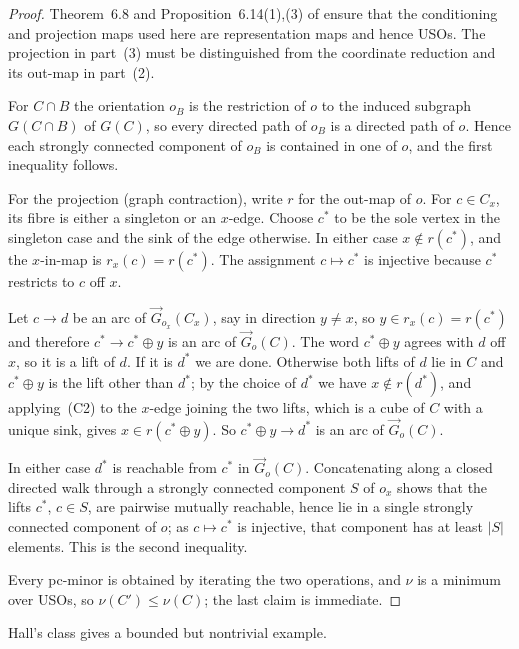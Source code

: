 \documentclass[11pt]{article}
\theoremstyle{definition}
\begin{document}
\begin{proof}
Theorem~6.8 and Proposition~6.14(1),(3) of \cite{CCMW} ensure that the
conditioning and projection maps used here are representation maps and hence
USOs. The projection in part~(3) must be distinguished from the coordinate
reduction and its out-map in part~(2).

For $C\cap B$ the orientation $o_{B}$ is the restriction of $o$ to the induced
subgraph $G(C\cap B)$ of $G(C)$, so every directed path of $o_{B}$ is a directed
path of $o$. Hence each strongly connected component of $o_{B}$ is contained in
one of $o$, and the first inequality follows.

For the projection (graph contraction), write $r$ for the out-map of $o$.
For $c\in C_x$, its fibre is either a singleton or an $x$-edge.
Choose $c^\ast$ to be the sole vertex in the singleton case and the sink
of the edge otherwise. In either case $x\notin r(c^\ast)$, and the
$x$-in-map is $r_x(c)=r(c^\ast)$. The assignment $c\mapsto c^\ast$
is injective because $c^\ast$ restricts to $c$ off $x$.

Let $c\to d$ be an arc of $\overrightarrow{G}_{o_{x}}(C_{x})$, say in direction
$y\ne x$, so $y\in r_{x}(c)=r(c^{\ast})$ and therefore $c^{\ast}\to c^{\ast}
\oplus y$ is an arc of $\overrightarrow{G}_{o}(C)$. The word $c^{\ast}\oplus y$
agrees with $d$ off $x$, so it is a lift of $d$. If it is $d^{\ast}$ we are done.
Otherwise both lifts of $d$ lie in $C$ and $c^{\ast}\oplus y$ is the lift other
than $d^{\ast}$; by the choice of $d^{\ast}$ we have $x\notin r(d^{\ast})$, and
applying~(C2) to the $x$-edge joining the two lifts, which is a cube of $C$ with
a unique sink, gives $x\in r(c^{\ast}\oplus y)$. So $c^{\ast}\oplus y\to
d^{\ast}$ is an arc of $\overrightarrow{G}_{o}(C)$.

In either case $d^{\ast}$ is reachable from $c^{\ast}$ in
$\overrightarrow{G}_{o}(C)$. Concatenating along a closed directed walk through a
strongly connected component $S$ of $o_{x}$ shows that the lifts $c^{\ast}$,
$c\in S$, are pairwise mutually reachable, hence lie in a single strongly
connected component of $o$; as $c\mapsto c^{\ast}$ is injective, that component
has at least $|S|$ elements. This is the second inequality.

Every pc-minor is obtained by iterating the two operations, and $\nu$ is a
minimum over USOs, so $\nu(C')\le\nu(C)$; the last claim is immediate.
\end{proof}


Hall's class gives a bounded but nontrivial example.
\end{document}
